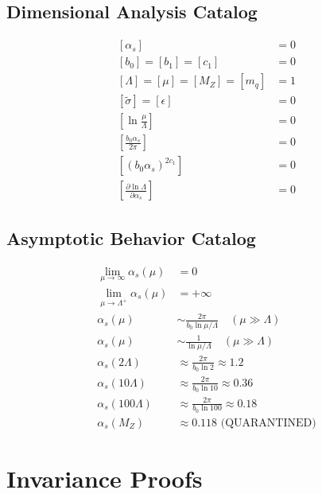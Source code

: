 \documentclass[11pt,a4paper]{article}
\theoremstyle{definition}
\begin{document}
\subsection{Dimensional Analysis Catalog}
\label{subsec:ext-dim}

\begin{align}
\label{eq:ext-57}
[\alpha_s] &= 0 \\
\label{eq:ext-58}
[b_0] = [b_1] = [c_1] &= 0 \\
\label{eq:ext-59}
[\Lambda] = [\mu] = [M_Z] = [m_q] &= 1 \\
\label{eq:ext-60}
[\tilde{\sigma}] = [\epsilon] &= 0 \\
\label{eq:ext-61}
\left[\ln\frac{\mu}{\Lambda}\right] &= 0 \\
\label{eq:ext-62}
\left[\frac{b_0\alpha_s}{2\pi}\right] &= 0 \\
\label{eq:ext-63}
\left[(b_0\alpha_s)^{2c_1}\right] &= 0 \\
\label{eq:ext-64}
\left[\frac{\partial\ln\Lambda}{\partial\alpha_s}\right] &= 0
\end{align}

\subsection{Asymptotic Behavior Catalog}
\label{subsec:ext-asymp}

\begin{align}
\label{eq:ext-65}
\lim_{\mu\to\infty}\alpha_s(\mu) &= 0 \\
\label{eq:ext-66}
\lim_{\mu\to\Lambda^+}\alpha_s(\mu) &= +\infty \\
\label{eq:ext-67}
\alpha_s(\mu) &\sim \frac{2\pi}{b_0\ln\mu/\Lambda} \quad (\mu \gg \Lambda) \\
\label{eq:ext-68}
\alpha_s(\mu) &\sim \frac{1}{\ln\mu/\Lambda} \quad (\mu \gg \Lambda) \\
\label{eq:ext-69}
\alpha_s(2\Lambda) &\approx \frac{2\pi}{b_0\ln 2} \approx 1.2 \\
\label{eq:ext-70}
\alpha_s(10\Lambda) &\approx \frac{2\pi}{b_0\ln 10} \approx 0.36 \\
\label{eq:ext-71}
\alpha_s(100\Lambda) &\approx \frac{2\pi}{b_0\ln 100} \approx 0.18 \\
\label{eq:ext-72}
\alpha_s(M_Z) &\approx 0.118 \text{ (QUARANTINED)}
\end{align}

\section{Invariance Proofs}
\label{app:invariance-proofs}
\end{document}
